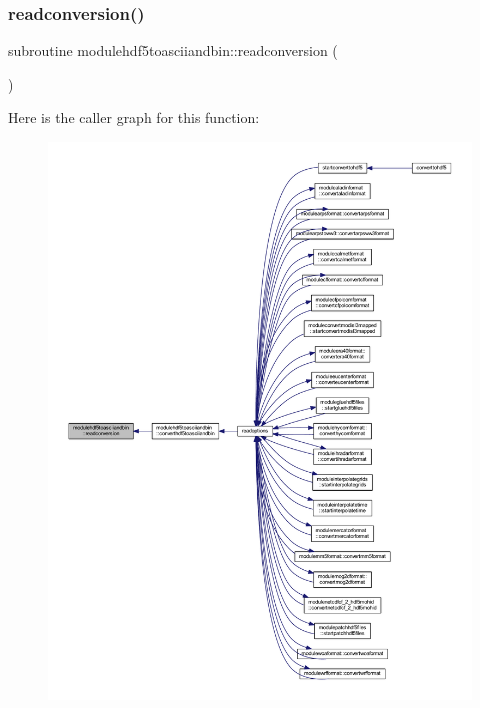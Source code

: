 \subsubsection{\texorpdfstring{readconversion()}{readconversion()}}
{\footnotesize\ttfamily subroutine modulehdf5toasciiandbin\+::readconversion (\begin{DoxyParamCaption}{ }\end{DoxyParamCaption})\hspace{0.3cm}{\ttfamily [private]}}

Here is the caller graph for this function\+:\nopagebreak
\begin{figure}[H]
\begin{center}
\leavevmode
\includegraphics[width=350pt]{namespacemodulehdf5toasciiandbin_aac7befc5bf0dee74c56166ddb4432fca_icgraph}
\end{center}
\end{figure}
\mbox{\label{namespacemodulehdf5toasciiandbin_acdf03424042f9020f63ddb9bd5d39fce}} 
